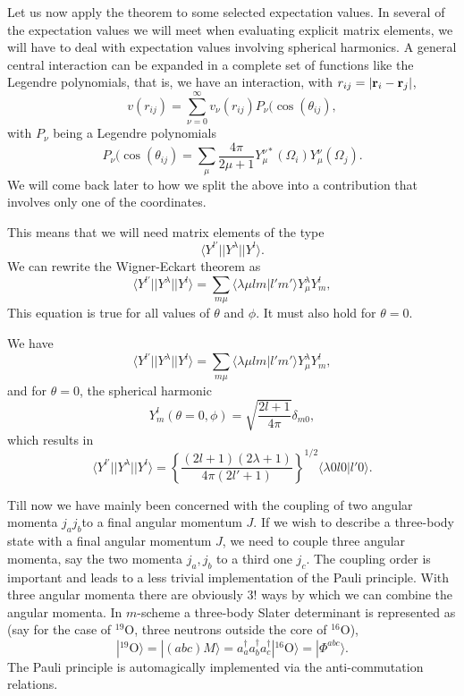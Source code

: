 \documentclass[graybox,sectrefs,envcountresetchap,open=right]{svmonodo}
\begin{document}
Let us now apply the theorem to some selected expectation values.
In several of the expectation values we will meet when evaluating explicit matrix elements, we will have to deal with expectation values involving spherical harmonics. A general central interaction can be expanded in a complete set of functions like the Legendre polynomials, that is, we have an interaction, with $r_{ij}=|{\bf r}_i-{\bf r}_j|$,
\[
v(r_{ij})=\sum_{\nu=0}^{\infty}v_{\nu}(r_{ij})P_{\nu}(\cos{(\theta_{ij})},
\]
with $P_{\nu}$ being a Legendre polynomials
\[
P_{\nu}(\cos{(\theta_{ij})}=\sum_{\mu}\frac{4\pi}{2\mu+1}Y_{\mu}^{\nu *}(\Omega_{i})Y_{\mu}^{\nu}(\Omega_{j}).
\]
We will come back later to how we split the above into a contribution that involves only one of the coordinates.



This means that we will need matrix elements of the type
\[
\langle Y^{l'}||Y^{\lambda}|| Y^{l}\rangle.
\]
We can rewrite the Wigner-Eckart theorem as 
\[
\langle Y^{l'}||Y^{\lambda}|| Y^{l}\rangle=\sum_{m\mu}\langle \lambda\mu lm|l'm'\rangle Y^{\lambda}_{\mu}Y^l_m,
\]
This equation is true for all values of $\theta$ and $\phi$. It must also hold for $\theta=0$.


We have 
\[
\langle Y^{l'}||Y^{\lambda}|| Y^{l}\rangle=\sum_{m\mu}\langle \lambda\mu lm|l'm'\rangle Y^{\lambda}_{\mu}Y^l_m,
\]
and for $\theta=0$, the spherical harmonic
\[
Y_m^l(\theta=0,\phi)=\sqrt{\frac{2l+1}{4\pi}}\delta_{m0}, 
\]
which results in 
\[
\langle Y^{l'}||Y^{\lambda}|| Y^{l}\rangle=\left\{\frac{(2l+1)(2\lambda+1)}{4\pi(2l'+1)}\right\}^{1/2}\langle \lambda0 l0|l'0\rangle.
\]


Till now we have mainly been concerned with the coupling of two angular momenta $j_aj_b$to a final angular momentum $J$.
If we wish to describe a three-body state with a final angular momentum $J$, we need to couple three angular momenta, say 
the two momenta $j_a,j_b$ to a third one $j_c$. The coupling order is important and leads to a less trivial implementation of the 
Pauli principle. With three angular momenta there are obviously $3!$ ways by which we can combine the angular momenta. 
In $m$-scheme a three-body Slater determinant is represented as (say for the case of $^{19}$O, three neutrons outside the core of $^{16}$O),
\[
|^{19}\mathrm{O}\rangle =|(abc)M\rangle  = a^{\dagger}_aa^{\dagger}_ba^{\dagger}_c|^{16}\mathrm{O}\rangle=|\Phi^{abc}\rangle.
\]
The Pauli principle is automagically implemented via the anti-commutation relations. 
\end{document}

